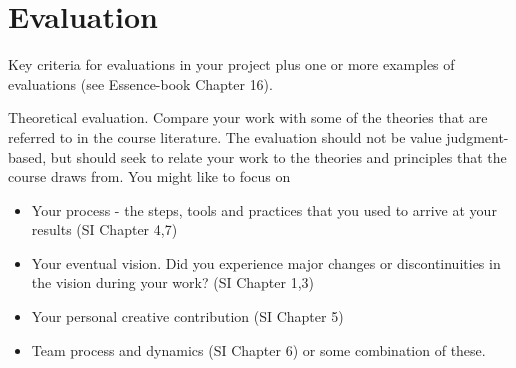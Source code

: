\section{Evaluation}
Key criteria for evaluations in your project plus one or more examples of evaluations  (see Essence-book Chapter 16).

Theoretical evaluation. Compare your work with some of the theories that are referred to in the course literature. The evaluation should not be value judgment-based, but should seek to relate your work to the theories and principles that the course draws from. You might like to focus on 
\begin{itemize}
\item Your process - the steps, tools and practices that you used to arrive at your results (SI Chapter 4,7)
\item Your eventual vision. Did you experience major changes or discontinuities in the vision during your work? (SI Chapter 1,3)
\item Your personal creative contribution (SI Chapter 5)
\item Team process and dynamics (SI Chapter 6) or some combination of these.
\end{itemize}